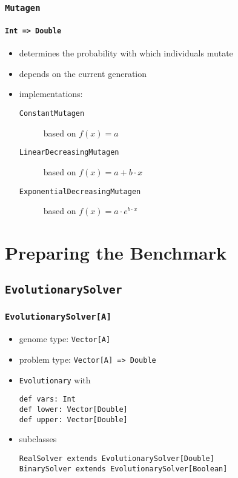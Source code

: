 \documentclass[compress,xcolor=table]{beamer}
\begin{document}
\begin{frame}
  \frametitle{\texttt{Mutagen}}
  \framesubtitle{\texttt{Int => Double}}
  \begin{itemize}
    \item determines the probability with which individuals mutate
    \item depends on the current generation
    \item implementations:
    \begin{description}
      \item[\texttt{ConstantMutagen}] $~$ \\ based on $f(x) = a$
      \item[\texttt{LinearDecreasingMutagen}] $~$ \\ based on $f(x) = a + b \cdot x$
      \item[\texttt{ExponentialDecreasingMutagen}] $~$ \\ based on $f(x) = a \cdot e^{b \cdot x}$
    \end{description}
  \end{itemize}
\end{frame}


\section{Preparing the Benchmark}

\subsection{\texttt{EvolutionarySolver}}

\begin{frame}
  \frametitle{\texttt{EvolutionarySolver[A]}}
  \begin{itemize}
    \item genome type: \texttt{Vector[A]}
    \item problem type: \texttt{Vector[A] => Double}
    \item \texttt{Evolutionary} with
    \begin{description}
      \item[\texttt{def vars: Int}]
      \item[\texttt{def lower: Vector[Double]}]
      \item[\texttt{def upper: Vector[Double]}]
    \end{description}
    \item subclasses
    \begin{description}
      \item[\texttt{RealSolver extends EvolutionarySolver[Double]}]
      \item[\texttt{BinarySolver extends EvolutionarySolver[Boolean]}]
    \end{description}
  \end{itemize}
\end{frame}
\end{document}
